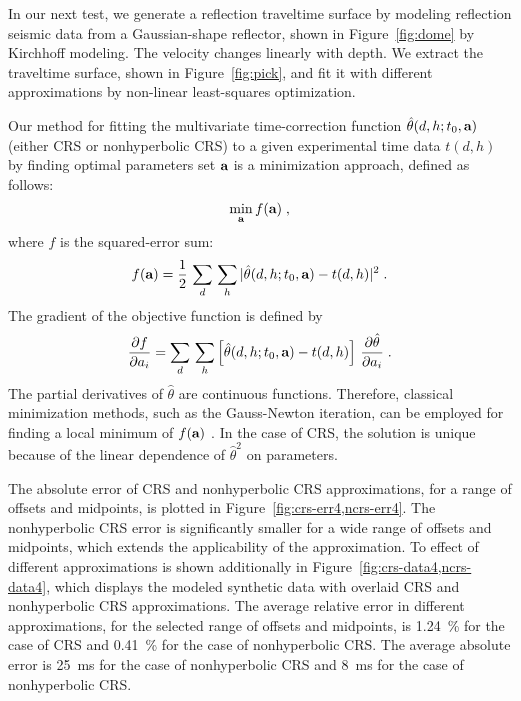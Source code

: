 %

%

In our next test, we generate a reflection traveltime surface by
modeling reflection seismic data from a Gaussian-shape reflector,
shown in Figure~\ref{fig:dome} by Kirchhoff modeling. The velocity
changes linearly with depth. We extract the traveltime surface, shown
in Figure~\ref{fig:pick}, and fit it with different approximations by
non-linear least-squares optimization. 

Our method for fitting the multivariate time-correction function
$\hat{\theta}(d,h;t_0,\textbf{a})$ (either CRS or nonhyperbolic
CRS) to a given experimental time data $t(d,h)$ by finding optimal
parameters set $\textbf{a}$ is a minimization approach, defined as
follows:
\begin{equation}
\label{eq:minimize}
\min_{ \textbf{a} } f( \textbf{a}  )\;,
\end{equation}
where $f$ is the squared-error sum:
\begin{equation}
\label{eq:minimize-function}
f( \textbf{a}) = \frac{1}{2}\,\sum\limits_d\,\sum\limits_h | \hat{\theta}(d,h; t_0, \textbf{a}) - t(d,h)|^2 \;.
\end{equation}
The gradient of the objective function is defined by
\begin{equation}
\label{eq:minimize-grad}
\frac{\partial f}{\partial {a_i}}
=
\sum\limits_d\,\sum\limits_h \left[ \hat{\theta}(d,h; t_0, \parvec{a}) - t(d,h) \right]\, 
%
\frac{\partial \hat{\theta}}{\partial a_i}\;.
\end{equation}
The partial derivatives of $\hat{\theta}$ are continuous
functions. Therefore, classical minimization methods, such as the
Gauss-Newton iteration, can be employed for finding a local minimum of
$f(\textbf{a})$ \cite[]{lsq}. 
In the case of CRS, the solution is
unique because of the linear dependence of $\hat{\theta}^2$ on
parameters.

The absolute error of CRS and nonhyperbolic CRS approximations, for a
range of offsets and midpoints, is plotted in
Figure~\ref{fig:crs-err4,ncrs-err4}. The nonhyperbolic CRS error is
significantly smaller for a wide range of offsets and midpoints, which
extends the applicability of the approximation.  To effect of
different approximations is shown additionally in
Figure~\ref{fig:crs-data4,ncrs-data4}, which displays the modeled
synthetic data with overlaid CRS and nonhyperbolic CRS approximations.
The average relative error in different approximations, for the
selected range of offsets and midpoints, is 1.24~\% for the case of
CRS and 0.41~\% for the case of nonhyperbolic CRS. The average
  absolute error is 25~ms for the case of nonhyperbolic CRS and 8~ms
  for the case of nonhyperbolic CRS.

